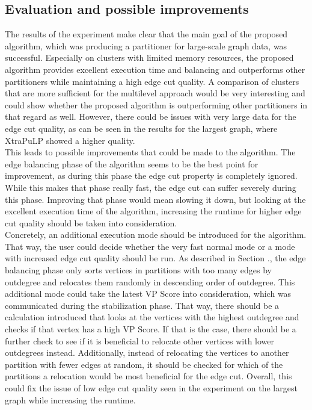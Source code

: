 \documentclass[acmsmall,nonacm,screen,review]{acmart}
\begin{document}
\subsection{Evaluation and possible improvements}
The results of the experiment make clear that the main goal of the proposed algorithm, which was producing a partitioner for large-scale graph data, was successful. Especially on clusters with limited memory resources, the proposed algorithm provides excellent execution time and balancing and outperforms other partitioners while maintaining a high edge cut quality. A comparison of clusters that are more sufficient for the multilevel approach would be very interesting and could show whether the proposed algorithm is outperforming other partitioners in that regard as well. However, there could be issues with very large data for the edge cut quality, as can be seen in the results for the largest graph, where XtraPuLP showed a higher quality. \\
This leads to possible improvements that could be made to the algorithm. The edge balancing phase of the algorithm seems to be the best point for improvement, as during this phase the edge cut property is completely ignored. While this makes that phase really fast, the edge cut can suffer severely during this phase. Improving that phase would mean slowing it down, but looking at the excellent execution time of the algorithm, increasing the runtime for higher edge cut quality should be taken into consideration. \\
Concretely, an additional execution mode should be introduced for the algorithm. That way, the user could decide whether the very fast normal mode or a mode with increased edge cut quality should be run. As described in Section ., the edge balancing phase only sorts vertices in partitions with too many edges by outdegree and relocates them randomly in descending order of outdegree. This additional mode could take the latest VP Score into consideration, which was communicated during the stabilization phase. That way, there should be a calculation introduced that looks at the vertices with the highest outdegree and checks if that vertex has a high VP Score. If that is the case, there should be a further check to see if it is beneficial to relocate other vertices with lower outdegrees instead. Additionally, instead of relocating the vertices to another partition with fewer edges at random, it should be checked for which of the partitions a relocation would be most beneficial for the edge cut. Overall, this could fix the issue of low edge cut quality seen in the experiment on the largest graph while increasing the runtime. 
\end{document}
